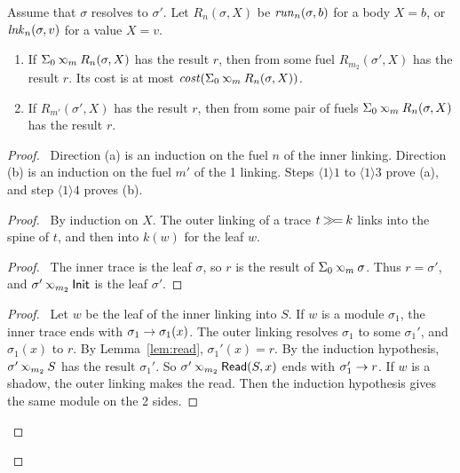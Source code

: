 \begin{thm}\label{thm:linklink}
  Assume that $\sigma$ resolves to $\sigma'$.
  Let $R_n(\sigma,X)$ be $\mathit{run}_{n}(\sigma,b)$ for a body $X=b$, or $\mathit{lnk}_{n}(\sigma,v)$ for a value $X=v$.
  \begin{enumerate}
    \item[(a)] If $\Sigma_0\lk{m}R_n(\sigma,X)$ has the result $r$, then from some fuel $R_{m_2}(\sigma',X)$ has the result $r$.
          Its cost is at most $\cost(\Sigma_0\lk{m}R_n(\sigma,X))$.
    \item[(b)] If $R_{m'}(\sigma',X)$ has the result $r$, then from some pair of fuels $\Sigma_0\lk{m}R_n(\sigma,X)$ has the result $r$.
  \end{enumerate}
\end{thm}
\begin{proof}
  \pfsketch\ Direction (a) is an induction on the fuel $n$ of the inner linking.
  Direction (b) is an induction on the fuel $m'$ of the 1 linking.
  Steps $\langle1\rangle1$ to $\langle1\rangle3$ prove (a), and step $\langle1\rangle4$ proves (b).
  \begin{proof}
    \pfsketch\ By induction on $X$.
    The outer linking of a trace $t\mathbin{\gg\!=} k$ links into the spine of $t$, and then into $k(w)$ for the leaf $w$.
    \begin{proof}
      \pf\ The inner trace is the leaf $\sigma$, so $r$ is the result of $\Sigma_0\lk{m}\sigma$.
      Thus $r=\sigma'$, and $\sigma'\lk{m_2}\InitE$ is the leaf $\sigma'$.
    \end{proof}
    \begin{proof}
      \pf\ Let $w$ be the leaf of the inner linking into $S$.
      If $w$ is a module $\sigma_1$, the inner trace ends with ${\sigma_1}\rightarrow{\sigma_1(x)}$.
      The outer linking resolves $\sigma_1$ to some $\sigma_1'$, and $\sigma_1(x)$ to $r$.
      By Lemma~\ref{lem:read}, $\sigma_1'(x)=r$.
      By the induction hypothesis, $\sigma'\lk{m_2}S$ has the result $\sigma_1'$.
      So $\sigma'\lk{m_2}\ReadE(S,x)$ ends with ${\sigma_1'}\rightarrow{r}$.
      If $w$ is a shadow, the outer linking makes the read.
      Then the induction hypothesis gives the same module on the 2 sides.
    \end{proof}

\end{proof}
\end{proof}
